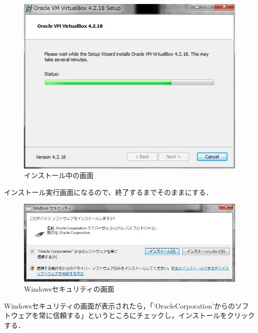 \begin{figure}[H]
\centering
\includegraphics[width=13cm]{It_is_install.jpg}
\caption{インストール中の画面}\label{サンプル図}
\end{figure}

インストール実行画面になるので、終了するまでそのままにする．

\begin{figure}[H]
\centering
\includegraphics[width=13cm]{device_install.jpg}
\caption{Windowsセキュリティの画面}\label{サンプル図}
\end{figure}

Windowsセキュリティの画面が表示されたら，「'OracleCorporation'からのソフトウェアを常に信頼する」というところにチェックし，インストールをクリックする．

